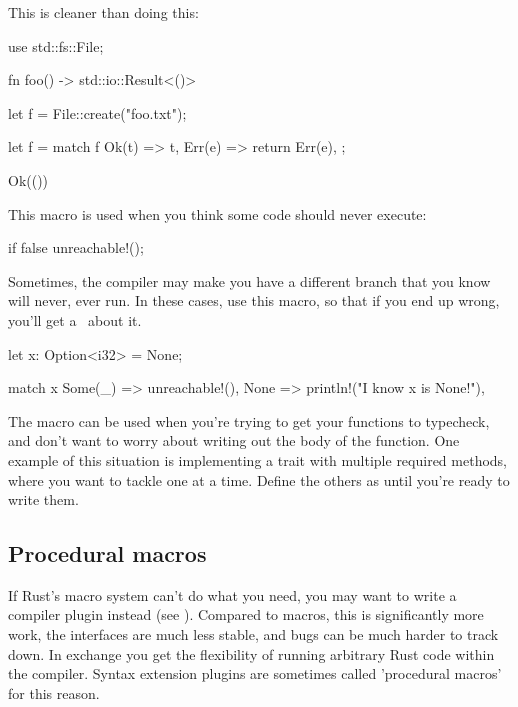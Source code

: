 This is cleaner than doing this:

\begin{rustc}
use std::fs::File;

fn foo() -> std::io::Result<()> {
    let f = File::create("foo.txt");

    let f = match f {
        Ok(t) => t,
        Err(e) => return Err(e),
    };

    Ok(())
}
\end{rustc}


This macro is used when you think some code should never execute:

\begin{rustc}
if false {
    unreachable!();
}
\end{rustc}

Sometimes, the compiler may make you have a different branch that you know will never, ever run. In these cases, use this macro, so 
that if you end up wrong, you'll get a \panic\ about it.

\begin{rustc}
let x: Option<i32> = None;

match x {
    Some(_) => unreachable!(),
    None => println!("I know x is None!"),
}
\end{rustc}


The  macro can be used when you're trying to get your functions to typecheck, and don't want to worry about writing 
out the body of the function. One example of this situation is implementing a trait with multiple required methods, where you want to tackle 
one at a time. Define the others as  until you're ready to write them.

\subsection*{Procedural macros}

If Rust's macro system can't do what you need, you may want to write a compiler plugin instead (see ). 
Compared to  macros, this is significantly more work, the interfaces are much less stable, and bugs can be much 
harder to track down. In exchange you get the flexibility of running arbitrary Rust code within the compiler. Syntax extension plugins 
are sometimes called 'procedural macros' for this reason.
